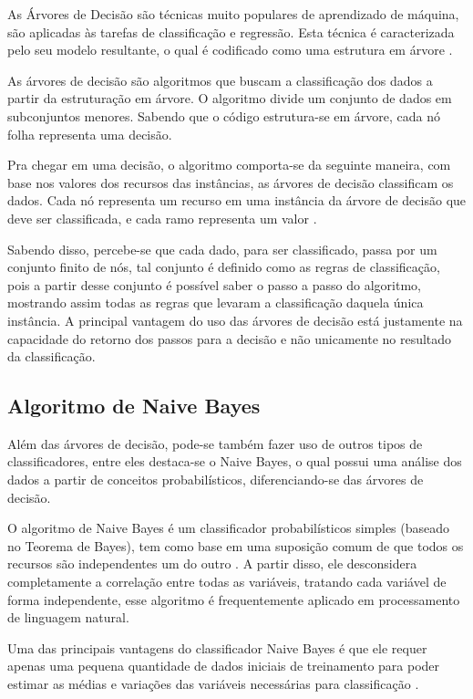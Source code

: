 \documentclass[preprint,12pt,times]{elsarticle}
\begin{document}
	As  Árvores de Decisão são técnicas muito populares de aprendizado de máquina, são aplicadas às tarefas de classificação e regressão. Esta técnica é caracterizada pelo seu modelo resultante, o qual é codificado como uma estrutura em árvore \cite{Nuti:2019}.

	As árvores de decisão são algoritmos que buscam a classificação dos dados a partir da estruturação em árvore. O algoritmo divide um conjunto de dados em subconjuntos menores. Sabendo que o código estrutura-se em árvore, cada nó folha representa uma decisão.

	Pra chegar em uma decisão, o algoritmo comporta-se da seguinte maneira, com base nos valores dos recursos das instâncias, as árvores de decisão classificam os dados. Cada nó representa um recurso em uma instância da árvore de decisão que deve ser classificada, e cada ramo representa um valor \cite{Pandya:2015}.

	Sabendo disso, percebe-se que cada dado, para ser classificado, passa por um conjunto finito de nós, tal conjunto é definido como as regras de classificação, pois a partir desse conjunto é possível saber o passo a passo do algoritmo, mostrando assim todas as regras que levaram a classificação daquela única instância. A principal vantagem do uso das árvores de decisão está justamente na capacidade do retorno dos passos para a decisão e não unicamente no resultado da classificação.

	\subsection{Algoritmo de Naive Bayes}

	Além das árvores de decisão, pode-se também fazer uso de outros tipos de classificadores, entre eles destaca-se o Naive Bayes, o qual possui uma análise dos dados a partir de conceitos probabilísticos, diferenciando-se das árvores de decisão.
	
	O algoritmo de Naive Bayes é um classificador probabilísticos simples (baseado no Teorema de Bayes), tem como base em uma suposição comum de que todos os recursos são independentes um do outro \cite{xu:2018}. A partir disso, ele desconsidera completamente a correlação entre todas as variáveis, tratando cada variável de forma independente, esse algoritmo  é frequentemente aplicado em processamento de linguagem natural.
	
	Uma das principais vantagens do classificador Naive Bayes é que ele requer apenas uma pequena quantidade de dados iniciais de treinamento para poder estimar as médias e variações das variáveis necessárias para classificação \cite{vijayarani:2015}.
	
\end{document}
